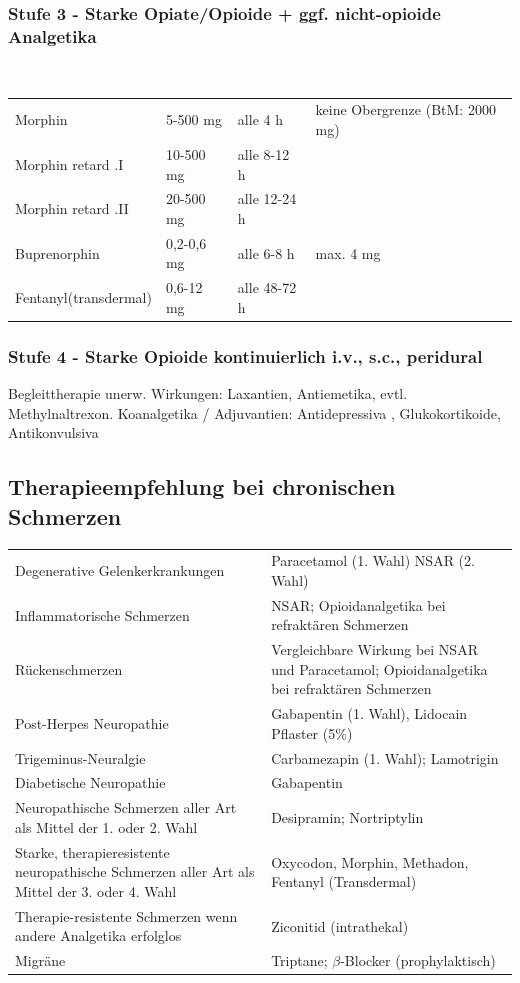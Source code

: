 \documentclass[10pt,a4paper]{report}
\begin{document}
\subsubsection{Stufe 3 - Starke Opiate/Opioide + ggf. nicht-opioide Analgetika} %
\label{par:stufe_}
\mbox{} \\
\begin{tabularx}{\textwidth}{XXXX}
Morphin&5-500 mg&alle 4 h&keine Obergrenze (BtM: 2000 mg)\\
Morphin retard .I&10-500 mg&alle 8-12 h&\\					
Morphin retard	.II&20-500 mg&alle 12-24 h&\\					
Buprenorphin&0,2-0,6 mg&alle 6-8 h&max. 4 mg\\
Fentanyl(transdermal)&0,6-12 mg&alle 48-72 h\\	
\end{tabularx}
\subsubsection{Stufe 4 - Starke Opioide kontinuierlich i.v., s.c., peridural} %
\label{par:stufe_}
Begleittherapie unerw. Wirkungen: Laxantien, Antiemetika, evtl. Methylnaltrexon. Koanalgetika / Adjuvantien: Antidepressiva , Glukokortikoide, Antikonvulsiva
\subsection{Therapieempfehlung bei chronischen Schmerzen} %
\label{sub:therapieempfehlung_bei_chronischen_schmerzen}
\begin{tabularx}{\textwidth}{XX}
Degenerative Gelenkerkrankungen&Paracetamol (1. Wahl) NSAR (2. Wahl)\\
Inflammatorische Schmerzen&NSAR; Opioidanalgetika bei refraktären Schmerzen\\
Rückenschmerzen&Vergleichbare Wirkung bei NSAR und Paracetamol; Opioidanalgetika bei refraktären Schmerzen\\
Post-Herpes Neuropathie&Gabapentin (1. Wahl), Lidocain Pflaster (5\%)\\
Trigeminus-Neuralgie&Carbamezapin (1. Wahl); Lamotrigin\\
Diabetische Neuropathie&Gabapentin\\
Neuropathische Schmerzen aller Art als Mittel der 1. oder 2. Wahl&Desipramin; Nortriptylin\\
Starke, therapieresistente neuropathische Schmerzen aller Art als Mittel der 3. oder 4. Wahl&Oxycodon, Morphin, Methadon, Fentanyl (Transdermal)\\
Therapie-resistente Schmerzen wenn andere Analgetika erfolglos&Ziconitid (intrathekal)\\
Migräne&Triptane; $\beta$-Blocker (prophylaktisch)\\
\end{tabularx}
\end{document}
